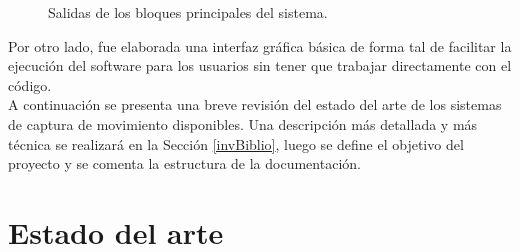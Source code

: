 \begin{figure}[ht!]
  \caption{Salidas de los bloques principales del sistema.}
      \label{ejemplotutiintro}
\end{figure}

Por otro lado, fue elaborada una interfaz gráfica básica de forma tal de facilitar la ejecución del software para los usuarios sin tener que trabajar directamente con el código.
\\ 

A continuación se presenta una breve revisión del estado del arte de los sistemas de captura de movimiento disponibles. Una descripción más detallada y más técnica se realizará en la Sección \ref{invBiblio}, luego se define el objetivo del proyecto y se comenta la estructura de la documentación.

\section{Estado del arte}

